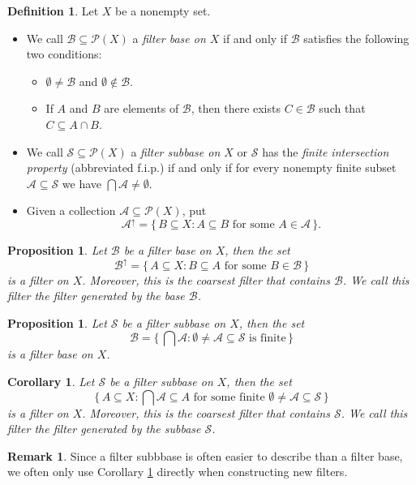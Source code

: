 \documentclass[12pt]{article}
\theoremstyle{plain}
\newtheorem{prop}[thm]{Proposition}
\newtheorem{cor}[thm]{Corollary}
\theoremstyle{definition}
\newtheorem{defn}[thm]{Definition}
\newtheorem{rmk}[thm]{Remark}
\newcommand{\calA}{\mathcal{A}}
\newcommand{\calB}{\mathcal{B}}
\newcommand{\calP}{\mathcal{P}}
\newcommand{\calS}{\mathcal{S}}
\begin{document}
\begin{defn}
  Let $X$ be a nonempty set.
  \begin{itemize}
    \item[(a)] We call $\calB \subseteq \calP(X)$ a \textsl{filter base on $X$} if and only if $\calB$ satisfies the following two conditions:
    \begin{itemize}
      \item[(1)] $\emptyset \ne \calB$ and $\emptyset \not\in \calB$.
        
      \item[(2)] If $A$ and $B$ are elements of $\calB$, then there exists $C \in \calB$ such that $C \subseteq A \cap B$.
    \end{itemize}

    \item[(b)] We call $\calS \subseteq \calP(X)$ a \textsl{filter subbase on $X$} or $\calS$ has the \textsl{finite intersection property} (abbreviated f.i.p.) if and only if for every nonempty finite subset $\calA \subseteq \calS$ we have $\bigcap \calA \ne \emptyset$.

    \item[(c)] Given a collection $\calA \subseteq \calP(X)$, put 
      \[
         \calA^\uparrow = \{\, B \subseteq X : \mbox{$A \subseteq B$ for some $A \in \calA$} \,\}.
      \]
  \end{itemize}
\end{defn}

\begin{prop}
  \label{prop:fltBase}
  Let $\calB$ be a filter base on $X$, then the set
  \[
    \calB^\uparrow = \{\, A \subseteq X : \mbox{$B \subseteq A$ for some $B \in \calB$} \,\}
  \]
  is a filter on $X$.
  Moreover, this is the coarsest filter that contains $\calB$.
  We call this filter the \textsl{filter generated by the base $\calB$}.
\end{prop}

\begin{prop}
  Let $\calS$ be a filter subbase on $X$, then the set
  \[
     \calB = \bigl\{\, \bigcap \calA : \mbox{$\emptyset \ne \calA \subseteq \calS$ is finite} \,\bigr\}
  \]
  is a filter base on $X$. 
\end{prop}
\begin{cor}
  \label{cor:fltSubbase}
  Let $\calS$ be a filter subbase on $X$, then the set
  \[
    \{\, A \subseteq X : \mbox{$\bigcap\calA \subseteq A$ for some finite $\emptyset \ne \calA \subseteq \calS$} \,\}
  \]
  is a filter on $X$.
  Moreover, this is the coarsest filter that contains $\calS$.
  We call this filter the \textsl{filter generated by the subbase $\calS$}.
\end{cor}
\begin{rmk}
  Since a filter subbbase is often easier to describe than a filter base, we often only use Corollary \ref{cor:fltSubbase} directly when constructing new filters.
\end{rmk}
\end{document}

